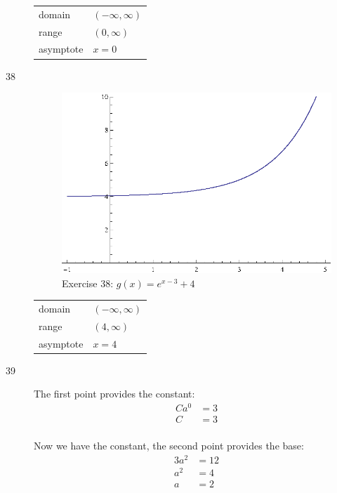 \documentclass{exam}
\begin{document}
\begin{description}
        \begin{tabular}[H]{ll}
          \toprule
          domain    & $(-\infty, \infty)$ \\
          range     & $(0, \infty)$ \\
          asymptote & $x = 0$ \\
          \bottomrule
        \end{tabular}

      \item[38] 
        \begin{figure}[H]
          \centering
          \includegraphics[scale=1.0]{exercise38.eps}
          \caption*{Exercise 38: $g(x) = e^{x - 3} + 4$}
        \end{figure}

        \begin{tabular}[H]{ll}
          \toprule
          domain    & $(-\infty, \infty)$ \\
          range     & $(4, \infty)$ \\
          asymptote & $x = 4$ \\
          \bottomrule
        \end{tabular}

      \item[39]
        The first point provides the constant:
        \begin{align*}
          Ca^0 &= 3 \\
          C    &= 3 \\
        \end{align*}

        Now we have the constant, the second point provides the base:
        \begin{align*}
          3a^2 &= 12 \\
          a^2  &= 4 \\
          a    &= 2 \\
        \end{align*}


\end{description}
\end{document}
